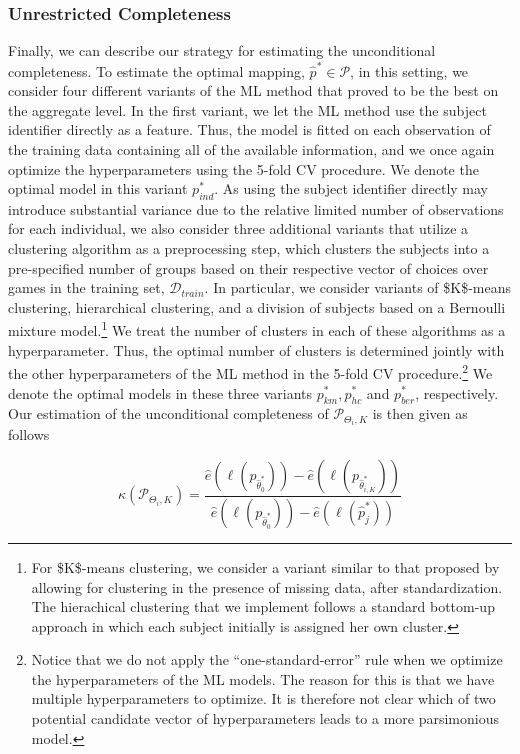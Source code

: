 \documentclass[11pt,a4paper]{article}
\theoremstyle{definition}
\begin{document}
\subsubsection{Unrestricted Completeness}
\label{subsubsec:unrestricted_completeness}
Finally, we can describe our strategy for estimating the unconditional completeness. To estimate the optimal mapping, \(\hat{p}^*\in\mathcal{P}\),  in this setting, we consider four different variants of the ML method that proved to be the best on the aggregate level. In the first variant, we let the ML method use the subject identifier directly as a feature. Thus, the model is fitted on each observation of the training data containing all of the available information, and we once again optimize the hyperparameters using the 5-fold CV procedure. We denote the optimal model in this variant \(p^*_{ind}\). As using the subject identifier directly may introduce substantial variance due to the relative limited number of observations for each individual, we also consider three additional variants that utilize a clustering algorithm as a preprocessing step, which clusters the subjects into a pre-specified number of groups based on their respective vector of choices over games in the training set, \(\mathcal{D}_{train}\). In particular, we consider variants of \$K\$-means clustering, hierarchical clustering, and a division of subjects based on a Bernoulli mixture model.\footnote{For \$K\$-means clustering, we consider a variant similar to that proposed by \cite{Chi2016} allowing for clustering in the presence of missing data, after standardization. The hierachical clustering that we implement follows a standard bottom-up approach in which each subject initially is assigned her own cluster.} We treat the number of clusters in each of these algorithms as a hyperparameter. Thus, the optimal number of clusters is determined jointly with the other hyperparameters of the ML method in the 5-fold CV procedure.\footnote{Notice that we do not apply the ``one-standard-error'' rule when we optimize the hyperparameters of the ML models. The reason for this is that we have multiple hyperparameters to optimize. It is therefore not clear which of two potential candidate vector of hyperparameters leads to a more parsimonious model.} We denote the optimal models in these three variants \(p^*_{km},p^*_{hc}\) and \(p^*_{ber}\), respectively. Our estimation of the unconditional completeness of \(\mathcal{P}_{\Theta_i,K}\) is then given as follows

\begin{equation}
\label{eq:uncond-completeness_estim}
\hat{\kappa}(\mathcal{P}_{\Theta_i,K})=\frac{\hat{e}(\ell(p_{\hat{\theta}^*_{0}}))-\hat{e}(\ell(p_{\hat{\theta}^*_{i,K}}))}{\hat{e}(\ell(p_{\hat{\theta}^*_{0}}))-\hat{e}(\ell(\hat{p}^*_{j}))}
\end{equation}
\end{document}
